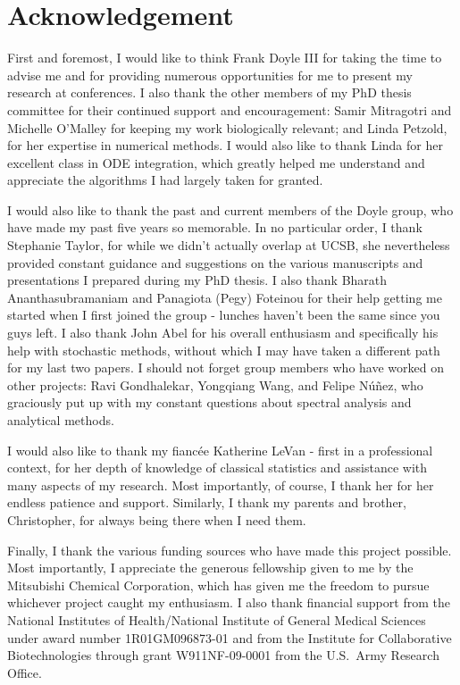 \chapter*{Acknowledgement}

{\singlespace

First and foremost, I would like to think Frank Doyle III for taking the time to advise me and for providing numerous opportunities for me to present my research at conferences.
I also thank the other members of my PhD thesis committee for their continued support and encouragement: Samir Mitragotri and Michelle O'Malley for keeping my work biologically relevant; and Linda Petzold, for her expertise in numerical methods.
I would also like to thank Linda for her excellent class in ODE integration, which greatly helped me understand and appreciate the algorithms I had largely taken for granted.

I would also like to thank the past and current members of the Doyle group, who have made my past five years so memorable.
In no particular order, I thank Stephanie Taylor, for while we didn't actually overlap at UCSB, she nevertheless provided constant guidance and suggestions on the various manuscripts and presentations I prepared during my PhD thesis.
I also thank Bharath Ananthasubramaniam and Panagiota (Pegy) Foteinou for their help getting me started when I first joined the group - lunches haven't been the same since you guys left.
I also thank John Abel for his overall enthusiasm and specifically his help with stochastic methods, without which I may have taken a different path for my last two papers.
I should not forget group members who have worked on other projects: Ravi Gondhalekar, Yongqiang Wang, and Felipe N\'{u}\~{n}ez, who graciously put up with my constant questions about spectral analysis and analytical methods.

I would also like to thank my fianc\'{e}e Katherine LeVan - first in a professional context, for her depth of knowledge of classical statistics and assistance with many aspects of my research.
Most importantly, of course, I thank her for her endless patience and support. 
Similarly, I thank my parents and brother, Christopher, for always being there when I need them.

Finally, I thank the various funding sources who have made this project possible.
Most importantly, I appreciate the generous fellowship given to me by the Mitsubishi Chemical Corporation, which has given me the freedom to pursue whichever project caught my enthusiasm.
I also thank financial support from the National Institutes of Health/National Institute of General Medical Sciences under award number 1R01GM096873-01 and from the Institute for Collaborative Biotechnologies through grant W911NF-09-0001 from the U.S.\ Army Research Office.

}


